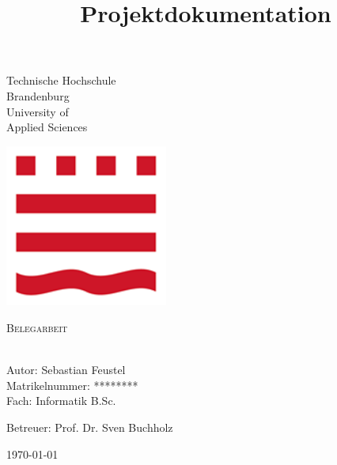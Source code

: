 \title{Projektdokumentation}

\begin{titlepage}
\begin{center}


\begin{minipage}{0.57\textwidth}
\begin{flushleft}\large
Technische Hochschule \\
Brandenburg \\
University of \\
Applied Sciences
\end{flushleft}
\end{minipage}
\hfill
\begin{minipage}{0.42\textwidth}
\begin{flushright}
\begin{center}
\includegraphics[width=0.4\textwidth]{logo.png}\\ 
\end{center}
\end{flushright}
\end{minipage}
\vfill
\vspace*{0.5cm}
\textsc{\large Belegarbeit }\\[0.5cm]



{ \Huge \bfseries \meinTitel \\[0.4cm]}

\vspace*{2.5cm}


\begin{minipage}{0.45\textwidth}
\begin{flushleft} \normalsize 
Autor: Sebastian Feustel \\
Matrikelnummer: ******** \\
Fach: Informatik B.Sc.

\end{flushleft}
\end{minipage}
\hfill
\begin{minipage}{0.45\textwidth}
\begin{flushright} \normalsize 
\begin{flushleft}
Betreuer: Prof. Dr. Sven Buchholz
\end{flushleft}
\end{flushright}
\end{minipage}

\vfill
{\normalsize  \today }
\vspace*{4.5cm}


\end{center}

\end{titlepage}